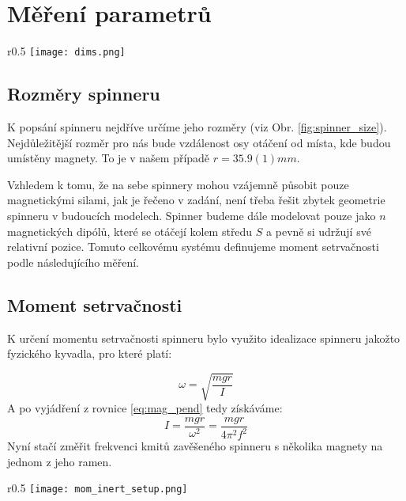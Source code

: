 \documentclass[12pt, a4paper,
 twoside,        %
 openright
]{report}
\begin{document}
\chapter{Měření parametrů}
\label{chap:param}

\begin{wrapfigure}{r}{0.5\textwidth}
    \vspace*{0.75cm}
    \texttt{[image: dims.png]}
    \centering
    \caption{Ilustrace spinneru společně s vyznačenými rozměry}
    \label{fig:spinner_size}
\end{wrapfigure}

\section{Rozměry spinneru}
\label{sec:spinner_size}
K popsání spinneru nejdříve určíme jeho rozměry (viz Obr. \ref{fig:spinner_size}).
Nejdůležitější rozměr pro nás bude vzdálenost osy otáčení od místa, kde budou umístěny magnety.
To je v našem případě $r = 35.9(1)mm$.

Vzhledem k tomu, že na sebe spinnery mohou vzájemně působit pouze magnetickými silami, jak je řečeno v zadání, není třeba řešit zbytek geometrie spinneru v budoucích modelech.
Spinner budeme dále modelovat pouze jako $n$ magnetických dipólů, které se otáčejí kolem středu $S$ a pevně si udržují své relativní pozice.
Tomuto celkovému systému definujeme moment setrvačnosti podle následujícího měření.
\section{Moment setrvačnosti}
\label{sec:moment_of_inertia}
{\raggedright
    K určení momentu setrvačnosti spinneru bylo využito idealizace spinneru jakožto fyzického kyvadla, pro které platí: \cite{physical_pendulum}
}
\begin{equation}
    \label{eq:mag_pend}
    \omega = \sqrt{\frac{mgr}{I}}
\end{equation}
A po vyjádření z rovnice \ref{eq:mag_pend} tedy získáváme:
\begin{equation}
    \label{eq:mom_inert}
    I = \frac{mgr}{\omega^2} = \frac{mgr}{4\pi^2f^2}
\end{equation}
Nyní stačí změřit frekvenci kmitů zavěšeného spinneru s několika magnety na jednom z jeho ramen.

\begin{wrapfigure}{r}{0.5\textwidth}
    \vspace*{-0.75cm}
    \texttt{[image: mom\_inert\_setup.png]}
    \centering
    \caption{Ilustrace aparatury pro měření frekvence kmitů spinneru}
    \label{fig:spinner_pendulum_aparature}
\end{wrapfigure}
\end{document}
